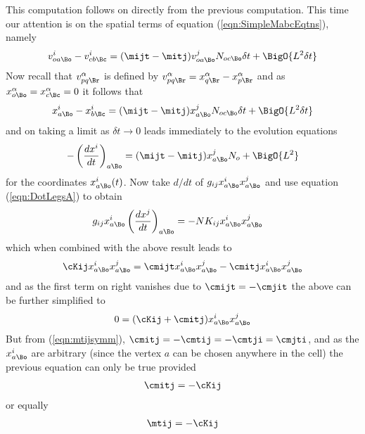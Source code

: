 \documentclass[a4paper,12pt]{article}
\numberwithin{equation}{section}
\begin{document}
This computation follows on directly from the previous computation. This time our
attention is on the spatial terms of equation (\ref{eqn:SimpleMabcEqtns}), namely
\begin{align}
   \begin{aligned}
      v^i_{oa\Bo} - v^i_{cb\Bc}
         = (\mijt-\mitj) v^j_{oa\Bo} N_{oc\Bo} \delta t
         + \BigO{L^2\delta t}
   \end{aligned}
\end{align}
Now recall that $v^\alpha_{pq\Br}$ is defined by $v^\alpha_{pq\Br} =
x^\alpha_{q\Br}-x^\alpha_{p\Br}$ and as $x^\alpha_{o\Bo}=x^\alpha_{c\Bc}=0$ it follows that
\begin{align}
   \begin{aligned}
      x^i_{a\Bo} - x^i_{b\Bc}
         = (\mijt-\mitj) x^j_{a\Bo} N_{oc\Bo} \delta t
         + \BigO{L^2\delta t}
   \end{aligned}
\end{align}
and on taking a limit as $\delta t\rightarrow0$ leads immediately to the
evolution equations
\begin{align}
   \label{eqn:DotX}
   -\left(\frac{dx^i}{dt}\right)_{a\Bo}
      = (\mijt-\mitj) x^j_{a\Bo} N_o
      + \BigO{L^2}
\end{align}
for the coordinates $x^i_{a\Bo}(t)$. Now take $d/dt$ of $g_{ij} x^i_{a\Bo} x^j_{a\Bo}$ and
use equation (\ref{eqn:DotLegsA}) to obtain
\begin{align}
   g_{ij} x^i_{a\Bo}\left(\frac{dx^j}{dt}\right)_{a\Bo} &= -N K_{ij} x^i_{a\Bo} x^j_{a\Bo}
\end{align}
which when combined with the above result leads to
\begin{align}
   \cKij x^i_{a\Bo} x^j_{a\Bo}
   = \cmijt x^i_{a\Bo} x^j_{a\Bo}
   - \cmitj x^i_{a\Bo} x^j_{a\Bo}
\end{align}
and as the first term on right vanishes due to $\cmijt = - \cmjit$ the above
can be further simplified to
\begin{align}
   0 = (\cKij + \cmitj) x^i_{a\Bo} x^j_{a\Bo}
\end{align}
But from (\ref{eqn:mtijsymm}), $\cmitj=-\cmtij=-\cmtji=\cmjti$, and as the $x^i_{a\Bo}$ are
arbitrary (since the vertex $a$ can be chosen anywhere in the cell) the previous equation can
only be true provided
\begin{align}
   \cmitj = - \cKij
\end{align}
or equally
\begin{align}
   \mtij = - \cKij
\end{align}
\end{document}
